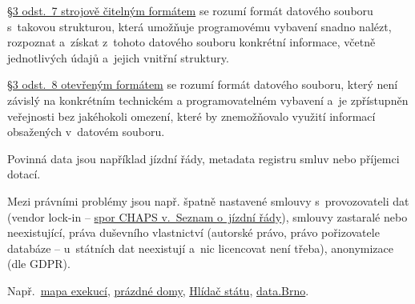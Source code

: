 \href{https://www.zakonyprolidi.cz/cs/1999-106#p3-7}{§3 odst.~7 strojově čitelným formátem} se rozumí formát datového souboru s~takovou strukturou, která umožňuje programovému vybavení snadno nalézt, rozpoznat a~získat z~tohoto datového souboru konkrétní informace, včetně jednotlivých údajů a~jejich vnitřní struktury.

\href{https://www.zakonyprolidi.cz/cs/1999-106#p3-8}{§3 odst.~8 otevřeným formátem} se rozumí formát datového souboru, který není závislý na konkrétním technickém a programovatelném vybavení a~je zpřístupněn veřejnosti bez jakéhokoli omezení, které by znemožňovalo využití informací obsažených v~datovém souboru.

Povinná data jsou například jízdní řády, metadata registru smluv nebo příjemci dotací.

Mezi právními problémy jsou např. špatně nastavené smlouvy s~provozovateli dat (vendor lock-in -- \href{http://ictjudikatura.law.muni.cz/wiki/6_As_38/2015_-_51_-_\%C5\%BD\%C3\%A1dost_o_specifick\%C3\%BD_form\%C3\%A1t_informac\%C3\%AD_(CHAPS)}{spor CHAPS v.~Seznam o~jízdní řády}), smlouvy zastaralé nebo neexistující, práva duševního vlastnictví (autorské právo, právo pořizovatele databáze -- u~státních dat neexistují a~nic licencovat není třeba), anonymizace (dle GDPR).

Např.~\href{https://mapaexekuci.cz}{mapa exekucí}, \href{https://prazdnedomy.cz}{prázdné domy}, \href{https://hlidacstatu.cz}{Hlídač státu}, \href{https://data.brno.cz}{data.Brno}.
